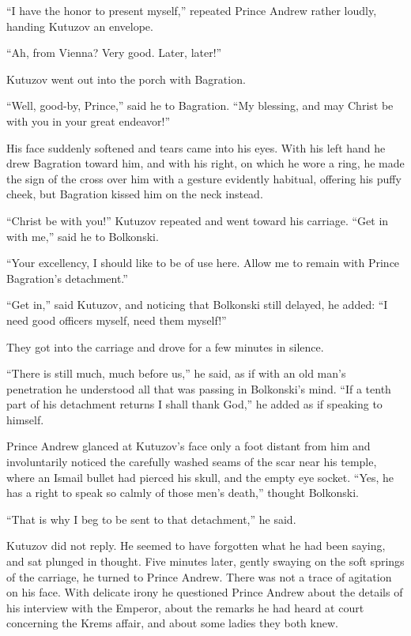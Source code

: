 ``I have the honor to present myself,'' repeated Prince Andrew
rather loudly, handing Kutuzov an envelope.

``Ah, from Vienna? Very good. Later, later!''

Kutuzov went out into the porch with Bagration.

``Well, good-by, Prince,'' said he to Bagration. ``My blessing,
and may Christ be with you in your great endeavor!''

His face suddenly softened and tears came into his eyes. With his
left hand he drew Bagration toward him, and with his right, on
which he wore a ring, he made the sign of the cross over him with
a gesture evidently habitual, offering his puffy cheek, but
Bagration kissed him on the neck instead.

``Christ be with you!'' Kutuzov repeated and went toward his
carriage.  ``Get in with me,'' said he to Bolkonski.

``Your excellency, I should like to be of use here. Allow me to
remain with Prince Bagration's detachment.''

``Get in,'' said Kutuzov, and noticing that Bolkonski still
delayed, he added: ``I need good officers myself, need them
myself!''

They got into the carriage and drove for a few minutes in
silence.

``There is still much, much before us,'' he said, as if with an
old man's penetration he understood all that was passing in
Bolkonski's mind. ``If a tenth part of his detachment returns I
shall thank God,'' he added as if speaking to himself.

Prince Andrew glanced at Kutuzov's face only a foot distant from
him and involuntarily noticed the carefully washed seams of the
scar near his temple, where an Ismail bullet had pierced his
skull, and the empty eye socket. ``Yes, he has a right to speak
so calmly of those men's death,'' thought Bolkonski.

``That is why I beg to be sent to that detachment,'' he said.

Kutuzov did not reply. He seemed to have forgotten what he had
been saying, and sat plunged in thought. Five minutes later,
gently swaying on the soft springs of the carriage, he turned to
Prince Andrew. There was not a trace of agitation on his
face. With delicate irony he questioned Prince Andrew about the
details of his interview with the Emperor, about the remarks he
had heard at court concerning the Krems affair, and about some
ladies they both knew.

